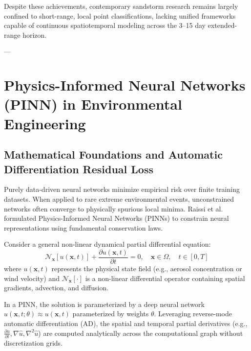 Despite these achievements, contemporary sandstorm research remains largely confined to short-range, local point classifications, lacking unified frameworks capable of continuous spatiotemporal modeling across the 3--15 day extended-range horizon.

---

\section{Physics-Informed Neural Networks (PINN) in Environmental Engineering}
\label{sec:pinn_review}

\subsection{Mathematical Foundations and Automatic Differentiation Residual Loss}
\label{subsec:pinn_architecture}

Purely data-driven neural networks minimize empirical risk over finite training datasets. When applied to rare extreme environmental events, unconstrained networks often converge to physically spurious local minima. Raissi et al.~\cite{raissi2019physics} formulated Physics-Informed Neural Networks (PINNs) to constrain neural representations using fundamental conservation laws.

Consider a general non-linear dynamical partial differential equation:
\begin{equation}
\label{eq:pinn_general_pde}
\mathcal{N}_\mathbf{x}[u(\mathbf{x}, t)] + \frac{\partial u(\mathbf{x}, t)}{\partial t} = 0, \quad \mathbf{x} \in \Omega, \quad t \in [0, T]
\end{equation}
where $u(\mathbf{x}, t)$ represents the physical state field (e.g., aerosol concentration or wind velocity) and $\mathcal{N}_\mathbf{x}[\cdot]$ is a non-linear differential operator containing spatial gradients, advection, and diffusion.

In a PINN, the solution is parameterized by a deep neural network $\hat{u}(\mathbf{x}, t; \theta) \approx u(\mathbf{x}, t)$ parameterized by weights $\theta$. Leveraging reverse-mode automatic differentiation (AD), the spatial and temporal partial derivatives (e.g., $\frac{\partial \hat{u}}{\partial t}, \nabla \hat{u}, \nabla^2 \hat{u}$) are computed analytically across the computational graph without discretization grids.

